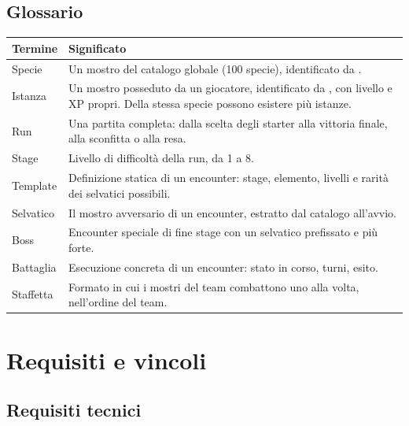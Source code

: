 \documentclass[11pt,a4paper]{article}
\begin{document}
\subsection{Glossario}

\begin{tabularx}{\linewidth}{@{}L{3.2cm}Y@{}}
  \toprule
  Termine & Significato \\
  \midrule
  Specie & Un mostro del catalogo globale (100 specie), identificato da . \\
  Istanza & Un mostro posseduto da un giocatore, identificato da , con livello e XP propri. Della stessa specie possono esistere più istanze. \\
  Run & Una partita completa: dalla scelta degli starter alla vittoria finale, alla sconfitta o alla resa. \\
  Stage & Livello di difficoltà della run, da 1 a 8. \\
  Template & Definizione statica di un encounter: stage, elemento, livelli e rarità dei selvatici possibili. \\
  Selvatico & Il mostro avversario di un encounter, estratto dal catalogo all'avvio. \\
  Boss & Encounter speciale di fine stage con un selvatico prefissato e più forte. \\
  Battaglia & Esecuzione concreta di un encounter: stato in corso, turni, esito. \\
  Staffetta & Formato in cui i mostri del team combattono uno alla volta, nell'ordine del team. \\
  \bottomrule
\end{tabularx}

\section{Requisiti e vincoli}\label{sec:requisiti}

\subsection{Requisiti tecnici}
\end{document}
